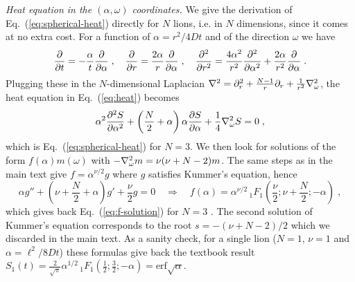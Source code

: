 \emph{Heat equation in the $(\alpha, \omega)$ coordinates.} We give the derivation of Eq.~(\ref{eq:spherical-heat}) directly for $N$ lions, i.e. in $N$ dimensions, since it comes at no extra cost. For a function of $\alpha = r^2/4Dt$ and of the direction $\omega$ we have
\begin{equation} \label{S:chain-rule}
    \pdv{}{t} = - \frac{\alpha}{t} \pdv{}{\alpha} \;, \quad \pdv{}{r} = \frac{2 \alpha}{r} \pdv{}{\alpha} \;, \quad \pdv[2]{}{r} = \frac{4 \alpha^2}{r^2} \pdv[2]{}{\alpha} + \frac{2 \alpha}{r^2} \pdv{}{\alpha} \;.
\end{equation}
Plugging these in the $N$-dimensional Laplacian $\laplacian = \partial_r^2 + \frac{N-1}{r} \partial_r + \frac{1}{r^2} \laplacian_\omega$, the heat equation in Eq.~(\ref{eq:heat}) becomes
\begin{equation} \label{S:heat-N}
    \alpha^2 \pdv[2]{S}{\alpha} + \left( \frac{N}{2} + \alpha \right) \alpha \pdv{S}{\alpha} + \frac{1}{4} \laplacian_\omega S = 0 \;,
\end{equation}
which is Eq.~(\ref{eq:spherical-heat}) for $N = 3$. We then look for solutions of the form $f(\alpha) m(\omega)$ with $- \laplacian_\omega m = \nu (\nu + N - 2) m$. The same steps as in the main text give $f = \alpha^{\nu/2} g$ where $g$ satisfies Kummer's equation, hence
\begin{equation} \label{S:f-N}
    \alpha g'' + \left( \nu + \frac{N}{2} + \alpha \right) g' + \frac{\nu}{2} g = 0 \quad \Longrightarrow \quad f(\alpha) = \alpha^{\nu/2} \,_1F_1\left( \frac{\nu}{2} ; \nu + \frac{N}{2} ; - \alpha \right) \;,
\end{equation}
which gives back Eq.~(\ref{eq:f-solution}) for $N = 3$ \cite{DLMF}. The second solution of Kummer's equation corresponds to the root $s = - (\nu + N - 2)/2$ which we discarded in the main text. As a sanity check, for a single lion ($N = 1$, $\nu = 1$ and $\alpha = \ell^2/8Dt$) these formulas give back the textbook result $S_1(t) = \frac{2}{\sqrt{\pi}} \alpha^{1/2} \,_1F_1(\frac{1}{2}; \frac{3}{2}; -\alpha) = \mathrm{erf} \sqrt{\alpha}$.

